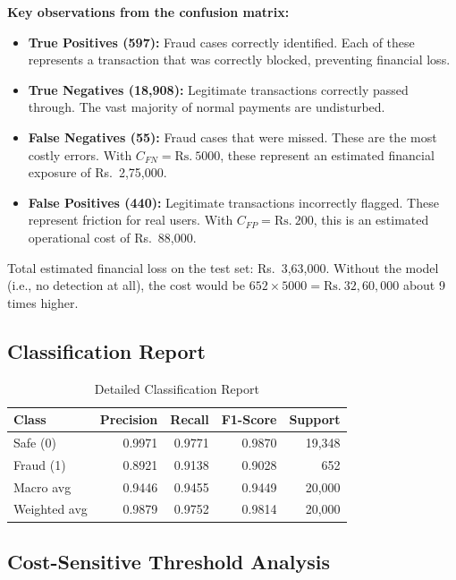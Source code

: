 \textbf{Key observations from the confusion matrix:}

\begin{itemize}
    \item \textbf{True Positives (597):} Fraud cases correctly identified. Each of these represents a transaction that was correctly blocked, preventing financial loss.
    \item \textbf{True Negatives (18,908):} Legitimate transactions correctly passed through. The vast majority of normal payments are undisturbed.
    \item \textbf{False Negatives (55):} Fraud cases that were missed. These are the most costly errors. With $C_{FN} = \text{Rs.}\ 5000$, these represent an estimated financial exposure of Rs.\ 2,75,000.
    \item \textbf{False Positives (440):} Legitimate transactions incorrectly flagged. These represent friction for real users. With $C_{FP} = \text{Rs.}\ 200$, this is an estimated operational cost of Rs.\ 88,000.
\end{itemize}

Total estimated financial loss on the test set: Rs.\ 3,63,000. Without the model (i.e., no detection at all), the cost would be $652 \times 5000 = \text{Rs.}\ 32,60,000$ about 9 times higher.

\subsection{Classification Report}

\begin{table}[H]
\centering
\caption{Detailed Classification Report}
\label{tab:classreport}
\begin{tabular}{|l|r|r|r|r|}
\hline
\textbf{Class} & \textbf{Precision} & \textbf{Recall} & \textbf{F1-Score} & \textbf{Support}\\
\hline
Safe (0) & 0.9971 & 0.9771 & 0.9870 & 19,348\\
\hline
Fraud (1) & 0.8921 & 0.9138 & 0.9028 & 652\\
\hline
Macro avg & 0.9446 & 0.9455 & 0.9449 & 20,000\\
\hline
Weighted avg & 0.9879 & 0.9752 & 0.9814 & 20,000\\
\hline
\end{tabular}
\end{table}

\subsection{Cost-Sensitive Threshold Analysis}

